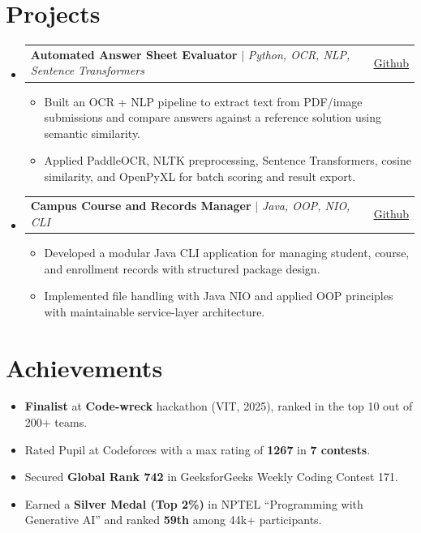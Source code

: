 \documentclass[letterpaper,11pt]{article}
\makeatletter
\newcommand{\resumeItem}[1]{
  \item\small{
    {#1 \vspace{-2pt}}
  }
}
\newcommand{\resumeProjectHeading}[2]{
    \item
    \begin{tabular*}{0.97\textwidth}{l@{\extracolsep{\fill}}r}
      \small#1 & #2 \\
    \end{tabular*}\vspace{-7pt}
}
\newcommand{\resumeSubHeadingListStart}{\begin{itemize}[leftmargin=0.15in, label={}]}
\newcommand{\resumeSubHeadingListEnd}{\end{itemize}}
\newcommand{\resumeItemListStart}{\begin{itemize}[leftmargin=*, itemsep=2pt, topsep=2pt]}
\newcommand{\resumeItemListEnd}{\end{itemize}\vspace{-5pt}}
\makeatother
\begin{document}
\section{Projects}
    \resumeSubHeadingListStart
      \resumeProjectHeading
          {\textbf{Automated Answer Sheet Evaluator} $|$ \emph{Python, OCR, NLP, Sentence Transformers}}{\underline{\href{https://github.com/modulusfunctionofy/DuplexRetrievalUniMarkupSystem}{Github}}}
          \resumeItemListStart
            \resumeItem{Built an OCR + NLP pipeline to extract text from PDF/image submissions and compare answers against a reference solution using semantic similarity.}
            \resumeItem{Applied PaddleOCR, NLTK preprocessing, Sentence Transformers, cosine similarity, and OpenPyXL for batch scoring and result export.}
          \resumeItemListEnd
      \resumeProjectHeading
          {\textbf{Campus Course and Records Manager} $|$ \emph{Java, OOP, NIO, CLI}}{\underline{\href{https://github.com/modulusfunctionofy/campus-course-records-manager-24BAI10142}{Github}}}
          \resumeItemListStart
            \resumeItem{Developed a modular Java CLI application for managing student, course, and enrollment records with structured package design.}
            \resumeItem{Implemented file handling with Java NIO and applied OOP principles with maintainable service-layer architecture.}
          \resumeItemListEnd
    \resumeSubHeadingListEnd

\section{Achievements}
  \begin{itemize}[leftmargin=*, itemsep=1pt, topsep=2pt]
    \resumeItem{\textbf{Finalist} at \textbf{Code-wreck} hackathon (VIT, 2025), ranked in the top 10 out of 200+ teams.}
    \resumeItem{Rated Pupil at Codeforces with a max rating of \textbf{1267} in \textbf{7 contests}.}
    \resumeItem{Secured \textbf{Global Rank 742} in GeeksforGeeks Weekly Coding Contest 171.}
    \resumeItem{Earned a \textbf{Silver Medal (Top 2\%)} in NPTEL ``Programming with Generative AI'' and ranked \textbf{59th} among 44k+ participants.}
  \end{itemize}

\end{document}
